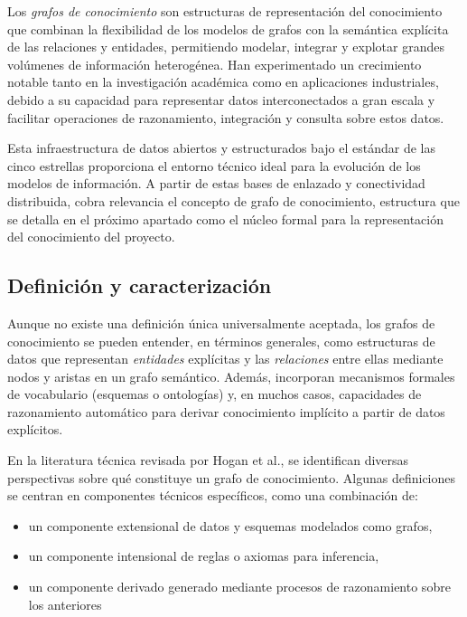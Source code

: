 \documentclass{article}
\begin{document}
Los \textit{grafos de conocimiento} son estructuras de representación del conocimiento que combinan la flexibilidad de los modelos de grafos con la semántica explícita de las relaciones y entidades, permitiendo modelar, integrar y explotar grandes volúmenes de información heterogénea. Han experimentado un crecimiento notable tanto en la investigación académica como en aplicaciones industriales, debido a su capacidad para representar datos interconectados a gran escala y facilitar operaciones de razonamiento, integración y consulta sobre estos datos.

Esta infraestructura de datos abiertos y estructurados bajo el estándar de las cinco estrellas proporciona el entorno técnico ideal para la evolución de los modelos de información. A partir de estas bases de enlazado y conectividad distribuida, cobra relevancia el concepto de grafo de conocimiento, estructura que se detalla en el próximo apartado como el núcleo formal para la representación del conocimiento del proyecto.

\subsection{Definición y caracterización}

Aunque no existe una definición única universalmente aceptada, los grafos de conocimiento se pueden entender, en términos generales, como estructuras de datos que representan \textit{entidades} explícitas y las \textit{relaciones} entre ellas mediante nodos y aristas en un grafo semántico. Además, incorporan mecanismos formales de vocabulario (esquemas o ontologías) y, en muchos casos, capacidades de razonamiento automático para derivar conocimiento implícito a partir de datos explícitos.

En la literatura técnica revisada por Hogan et al.\cite{hogan2020knowledgegraphs}, se identifican diversas perspectivas sobre qué constituye un grafo de conocimiento. Algunas definiciones se centran en componentes técnicos específicos, como una combinación de:
\begin{itemize}
    \item un componente extensional de datos y esquemas modelados como grafos, 
    \item un componente intensional de reglas o axiomas para inferencia,
    \item un componente derivado generado mediante procesos de razonamiento sobre los anteriores
\end{itemize}
\end{document}
